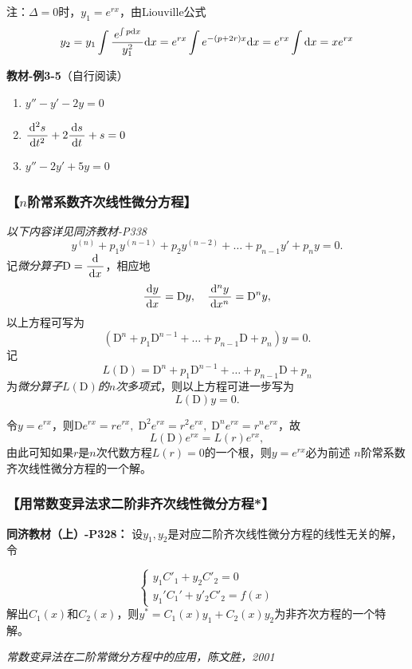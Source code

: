 注：$\Delta=0$时，$y_1=e^{rx}$，由Liouville公式
$$y_2=y_1\displaystyle\int\displaystyle\frac{\,{e^{\int p\mathrm{d} x}}\,}{\,{y_1^2}\,}\mathrm{d} x
=e^{rx}\displaystyle\int e^{-(p+2r)x}\mathrm{d} x=e^{rx}\displaystyle\int\mathrm{d} x=xe^{rx}$$

{\bf 教材-例3-5}（自行阅读）
\begin{enumerate}[(1)]
  \setlength{\itemindent}{1cm}
  \item $y''-y'-2y=0$
  \item $\displaystyle\frac{\,{\mathrm{d}^2s}\,}{\,{\mathrm{d} t^2}\,}+2\displaystyle\frac{\,{\mathrm{d} s}\,}{\,{\mathrm{d} t}\,}+s=0$
  \item $y''-2y'+5y=0$
\end{enumerate}

\begin{shaded}
	\subsubsection{【$n$阶常系数齐次线性微分方程】}
	{\it 以下内容详见同济教材-P338}
	$$y^{(n)}+p_1y^{(n-1)}+p_2y^{(n-2)}+\ldots+p_{n-1}y'+p_ny=0.$$
	记{\it 微分算子}$\mathrm{D}=\displaystyle\frac{\,{\mathrm{d}}\,}{\,{\mathrm{d} x}\,}$，相应地
	$$\displaystyle\frac{\,{\mathrm{d} y}\,}{\,{\mathrm{d} x}\,}=\mathrm{D}y,\quad \displaystyle\frac{\,{\mathrm{d}^n y}\,}{\,{\mathrm{d} x^n}\,}=\mathrm{D}^ny,$$
	以上方程可写为
	$$(\mathrm{D}^n+p_1\mathrm{D}^{n-1}+\ldots+p_{n-1}\mathrm{D}
	+p_n)y=0.$$
	记
	$$L(\mathrm{D})=\mathrm{D}^n+p_1\mathrm{D}^{n-1}+\ldots+p_{n-1}\mathrm{D}
	+p_n$$
	为{\it 微分算子$L(\mathrm{D})$的$n$次多项式}，则以上方程可进一步写为
	$$L(\mathrm{D})y=0.$$
	
	令$y=e^{rx}$，则$\mathrm{D}e^{rx}=re^{rx},\;\mathrm{D}^2e^{rx}=r^2e^{rx},
	\;\mathrm{D}^ne^{rx}=r^ne^{rx}$，故
	$$L(\mathrm{D})e^{rx}=L(r)e^{rx},$$
	由此可知如果$r$是$n$次代数方程$L(r)=0$的一个根，则$y=e^{rx}$必为前述
	$n$阶常系数齐次线性微分方程的一个解。
\end{shaded}

\subsubsection{【用常数变异法求二阶非齐次线性微分方程*】}

\begin{shaded}
{\bf 同济教材（上）-P328：}
设$y_1,y_2$是对应二阶齐次线性微分方程的线性无关的解，令

$$
\left\{\begin{array}{l}
y_1C'_1+y_2C'_2=0\\
y_1'C_1'+y'_2C'_2=f(x)
\end{array}\right.
$$
解出$C_1(x)$和$C_2(x)$，则$y^*=C_1(x)y_1+C_2(x)y_2$为非齐次方程的一个特解。
\end{shaded}

{\it 常数变异法在二阶常微分方程中的应用，陈文胜，2001}

